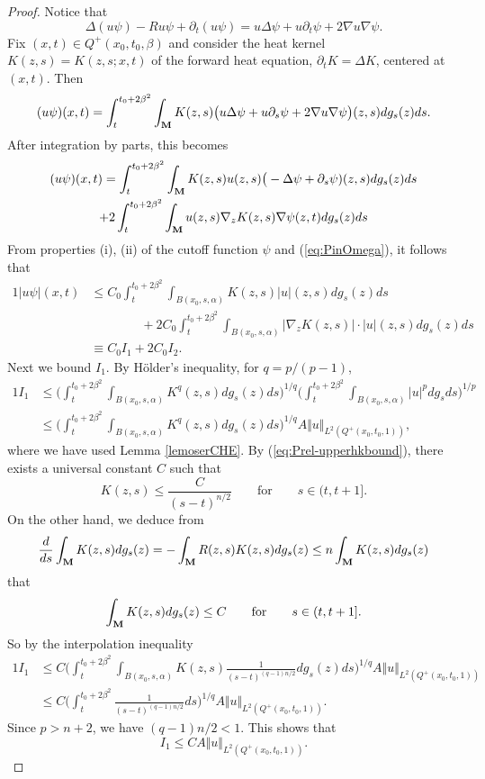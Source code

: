 \documentclass[11pt]{amsart}
\numberwithin{equation}{section}
\def\M{{\bf M}}
\numberwithin{equation}{section}
\begin{document}
\begin{proof}
Notice that
\[ \Delta (u \psi) - R u \psi + \partial_t (u\psi) = u \Delta \psi + u \partial_t \psi + 2 \nabla u \nabla \psi. \]
Fix $(x, t) \in Q^+ (x_0, t_0, \beta)$ and consider the heat kernel $K (z, s) = K(z, s ; x, t)$ of the forward heat equation, $\partial_t K = \Delta K$, centered at $(x,t)$.
Then
\[  (u \psi) (x,t) = \int_t^{t_0 + 2\beta^2} \int_{\M} K(z,s) \big( u \Delta \psi + u \partial_s \psi + 2 \nabla u \nabla \psi \big) (z,s) dg_s (z) ds.  \]
After integration by parts, this becomes
\begin{multline*}
 (u \psi) (x,t) =   \int_t^{t_0 + 2\beta^2} \int_{\M} K(z,s) u(z,s) \big( - \Delta \psi + \partial_s \psi) (z,s) dg_s(z) ds  \\
+ 2  \int_t^{t_0 + 2\beta^2} \int_{\M} u(z,s) \nabla_z K(z,s) \nabla \psi (z,t) dg_s(z) ds
\end{multline*}
From properties (i), (ii) of the cutoff function $\psi$ and (\ref{eq:PinOmega}), it follows that
\begin{alignat*}{1}
|u \psi |(x,t) &\leq C_0 \int_{t}^{t_0 + 2\beta^2} \int_{B(x_0, s, \alpha)} K(z,s) |u| (z,s) dg_s (z) ds \\
&\qquad\qquad + 2C_0 \int_t^{t_0 + 2\beta^2} \int_{B(x_0, s, \alpha)} |\nabla_z K(z,s)| \cdot |u| (z,s) dg_s (z) ds \\
&\equiv C_0 I_1 + 2 C_0 I_2.
\end{alignat*}
Next we bound $I_1$.
By H\"older's inequality, for $q = p/(p-1)$,
\begin{alignat*}{1}
I_1 &\leq \bigg( \int_t^{t_0 + 2\beta^2} \int_{B(x_0, s, \alpha)} K^q(z,s) dg_s (z) ds \bigg)^{1/q} \bigg( \int_t^{t_0 + 2\beta^2} \int_{B(x_0, s, \alpha)} |u|^p dg_s ds \bigg)^{1/p} \\
&\leq \bigg( \int_t^{t_0 + 2\beta^2} \int_{B(x_0, s, \alpha)} K^q(z,s) dg_s (z) ds \bigg)^{1/q} A \Vert u \Vert_{L^2 (Q^+(x_0, t_0, 1))},
\end{alignat*}
where we have used Lemma \ref{lemoserCHE}.
By (\ref{eq:Prel-upperhkbound}), there exists a universal constant $C$ such that
\begin{equation} \label{G<1/tn/2}
K(z, s) \le \frac{C}{(s-t)^{n/2}} \qquad \text{for} \qquad s \in (t, t + 1]. 
\end{equation}
On the other hand, we deduce from
\[ \frac{d}{ds} \int_{\M} K(z,s) dg_s (z) = - \int_{\M} R(z,s) K(z,s) dg_s (z) \leq n \int_{\M} K(z,s) dg_s (z) \]
that
\[ \int_{\M} K(z,s ) dg_s (z) \leq C \qquad \text{for} \qquad s \in (t, t+1]. \]
So by the interpolation inequality
\begin{alignat*}{1}
I_1 &\leq C \bigg( \int_{t}^{t_0 + 2\beta^2} \int_{B(x_0, s, \alpha)} K (z, s)  \frac1{(s-t)^{(q-1) n/2}} dg_s (z) ds \bigg)^{1/q} A \Vert u \Vert_{L^2 (Q^+(x_0, t_0, 1))} \\
 &\leq C \bigg( \int_t^{t_0+ 2\beta^2}  \frac1{(s-t)^{(q-1) n/2}} ds \bigg)^{1/q} A \Vert u \Vert_{L^2 (Q^+(x_0, t_0, 1))} .
\end{alignat*}
Since $p > n+2$, we have $(q - 1) n/2 < 1$.
This shows that
\[
I_1 \leq C A \Vert u \Vert_{L^2(Q^+(x_0, t_0, 1))}.
\]


\end{proof}
\end{document}
